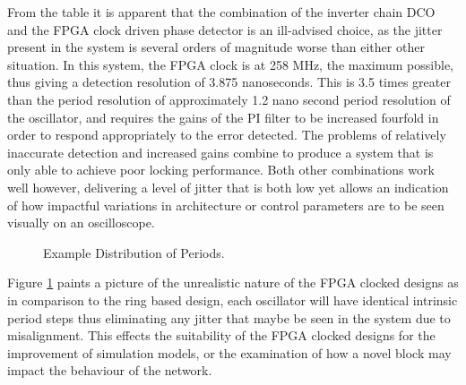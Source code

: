 \documentclass[conference]{IEEEtran}
\begin{document}
{From the table it is apparent that the combination of the inverter chain DCO and the FPGA clock driven phase detector is an ill-advised choice, as the jitter present in the system is several orders of magnitude worse than either other situation. In this system, the FPGA clock is at 258 MHz, the maximum possible, thus giving a detection resolution of 3.875 nanoseconds. This is 3.5 times greater than the period resolution of approximately 1.2 nano second period resolution of the oscillator, and requires the gains of the PI filter to be increased fourfold in order to respond appropriately to the error detected. The problems of relatively inaccurate detection and increased gains combine to produce a system that is only able to achieve poor locking performance.
Both other combinations work well however, delivering a level of jitter that is both low yet allows an indication of how impactful variations in architecture or control parameters are to be seen visually on an oscilloscope.\\

\begin{figure}[h]%
    \centering
    \caption{Example Distribution of Periods.\label{fig:dists}}    
\end{figure}
Figure \ref{fig:dists} paints a picture of the unrealistic nature of the FPGA clocked designs as in comparison to the ring based design, each oscillator will have identical intrinsic period steps thus eliminating any jitter that maybe be seen in the system due to misalignment. This effects the suitability of the FPGA clocked designs for the improvement of simulation models, or the examination of how a novel block may impact the behaviour of the network.
}
\end{document}
